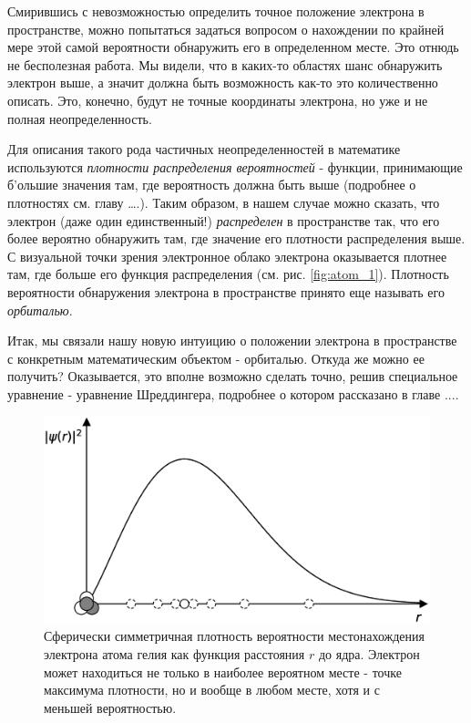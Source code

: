 Смирившись с невозможностью определить точное положение электрона в пространстве, можно попытаться задаться вопросом о нахождении по крайней мере этой самой вероятности обнаружить его в определенном месте.
Это отнюдь не бесполезная работа.
Мы видели, что в каких-то областях шанс обнаружить электрон выше, а значит должна быть возможность как-то это количественно описать.
Это, конечно, будут не точные координаты электрона, но уже и не полная неопределенность.

Для описания такого рода частичных неопределенностей в математике используются \textit{плотности распределения вероятностей} - функции, принимающие б'ольшие значения там, где вероятность должна быть выше (подробнее о плотностях см. главу ….).
Таким образом, в нашем случае можно сказать, что электрон (даже один единственный!) \textit{распределен} в пространстве так, что его более вероятно обнаружить там, где значение его плотности распределения выше.
С визуальной точки зрения электронное облако электрона оказывается плотнее там, где больше его функция распределения (см. рис. \ref{fig:atom_1}).
Плотность вероятности обнаружения электрона в пространстве принято еще называть его \textit{орбиталью}.

Итак, мы связали нашу новую интуицию о положении электрона в пространстве с конкретным математическим объектом - орбиталью. 
Откуда же можно ее получить?
Оказывается, это вполне возможно сделать точно, решив специальное уравнение - уравнение Шреддингера, подробнее о котором рассказано в главе ....

\begin{figure}[t!]
   \centering
   \includegraphics[scale=0.4]{images/radial_prob}
   \caption{Сферически симметричная плотность вероятности местонахождения электрона атома гелия как функция расстояния $r$ до ядра. Электрон может находиться не только в наиболее вероятном месте - точке максимума плотности, но и вообще в любом месте, хотя и с меньшей вероятностью.}
   \label{fig:radial_prob}
\end{figure}

